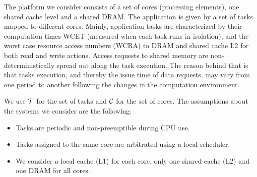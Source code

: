 \label{sec:modeling}
The platform we consider consists of a set of cores (processing elements), one shared cache level and a shared DRAM. %
The application is given by a set of tasks mapped to different cores. Mainly, application tasks are characterized by their computation times WCET (measured when each task runs in isolation), and the worst case resource access numbers (WCRA) \cite{Nowotsch14} to DRAM and shared cache L2 for both read and write actions. Access requests to shared memory are non-deterministically spread out along the task execution. The reason behind that is that tasks execution, and thereby the issue time of data requests, may vary from one period to another following the changes in the computation environment. 

We use ${\cal T}$ for the set of tasks and ${\cal C}$ for the set of cores. The assumptions about the systems we consider are the following: 
%
\begin{itemize}
\item Tasks are periodic and non-preemptible during CPU use. 
\item Tasks assigned to the same core are arbitrated using a local scheduler. 
\item We consider a local cache (L1) for each core, only one shared cache (L2) and one DRAM for all cores.
\end{itemize}

